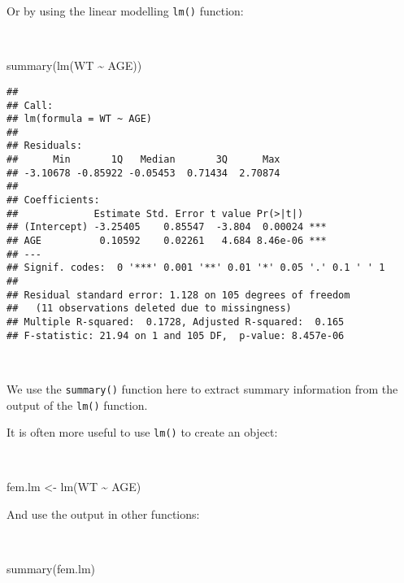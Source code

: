 \documentclass[
  12pt,
  a4paper]{book}
\newenvironment{Shaded}{\begin{snugshade}}{\end{snugshade}}
\newcommand{\FunctionTok}[1]{\textcolor[rgb]{0.00,0.00,0.00}{#1}}
\newcommand{\NormalTok}[1]{#1}
\newcommand{\OtherTok}[1]{\textcolor[rgb]{0.56,0.35,0.01}{#1}}
\newcommand{\SpecialCharTok}[1]{\textcolor[rgb]{0.00,0.00,0.00}{#1}}
\begin{document}
\newpage

Or by using the linear modelling \texttt{lm()} function:

~

\begin{Shaded}
\begin{Highlighting}[]
\FunctionTok{summary}\NormalTok{(}\FunctionTok{lm}\NormalTok{(WT }\SpecialCharTok{\textasciitilde{}}\NormalTok{ AGE))}
\end{Highlighting}
\end{Shaded}

\begin{verbatim}
## 
## Call:
## lm(formula = WT ~ AGE)
## 
## Residuals:
##      Min       1Q   Median       3Q      Max 
## -3.10678 -0.85922 -0.05453  0.71434  2.70874 
## 
## Coefficients:
##             Estimate Std. Error t value Pr(>|t|)    
## (Intercept) -3.25405    0.85547  -3.804  0.00024 ***
## AGE          0.10592    0.02261   4.684 8.46e-06 ***
## ---
## Signif. codes:  0 '***' 0.001 '**' 0.01 '*' 0.05 '.' 0.1 ' ' 1
## 
## Residual standard error: 1.128 on 105 degrees of freedom
##   (11 observations deleted due to missingness)
## Multiple R-squared:  0.1728, Adjusted R-squared:  0.165 
## F-statistic: 21.94 on 1 and 105 DF,  p-value: 8.457e-06
\end{verbatim}

~

We use the \texttt{summary()} function here to extract summary information from the output of the \texttt{lm()} function.

It is often more useful to use \texttt{lm()} to create an object:

~

\begin{Shaded}
\begin{Highlighting}[]
\NormalTok{fem.lm }\OtherTok{\textless{}{-}} \FunctionTok{lm}\NormalTok{(WT }\SpecialCharTok{\textasciitilde{}}\NormalTok{ AGE)}
\end{Highlighting}
\end{Shaded}

\newpage

And use the output in other functions:

~

\begin{Shaded}
\begin{Highlighting}[]
\FunctionTok{summary}\NormalTok{(fem.lm)}
\end{Highlighting}
\end{Shaded}
\end{document}
